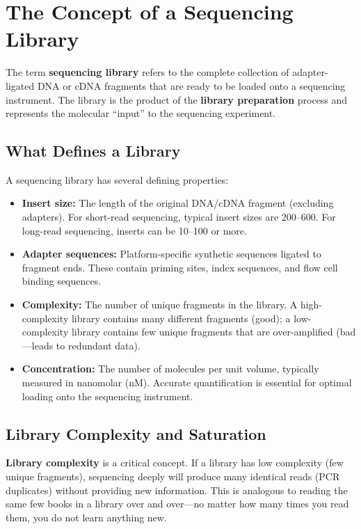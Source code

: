 \section{The Concept of a Sequencing Library}
\label{sec:seqprinciples:library}

The term \textbf{sequencing library} refers to the complete collection of adapter-ligated DNA or cDNA fragments that are ready to be loaded onto a sequencing instrument. The library is the product of the \textbf{library preparation} process and represents the molecular ``input'' to the sequencing experiment.

\subsection{What Defines a Library}
\label{subsec:seqprinciples:library-definition}

A sequencing library has several defining properties:

\begin{itemize}[itemsep=2pt]
  \item \textbf{Insert size:} The length of the original DNA/cDNA fragment (excluding adapters). For short-read sequencing, typical insert sizes are 200--600\basepair{}. For long-read sequencing, inserts can be 10--100\kilobase{} or more.
  \item \textbf{Adapter sequences:} Platform-specific synthetic sequences ligated to fragment ends. These contain priming sites, index sequences, and flow cell binding sequences.
  \item \textbf{Complexity:} The number of unique fragments in the library. A high-complexity library contains many different fragments (good); a low-complexity library contains few unique fragments that are over-amplified (bad---leads to redundant data).
  \item \textbf{Concentration:} The number of molecules per unit volume, typically measured in nanomolar (nM). Accurate quantification is essential for optimal loading onto the sequencing instrument.
\end{itemize}

\subsection{Library Complexity and Saturation}
\label{subsec:seqprinciples:library-complexity}

\textbf{Library complexity} is a critical concept. If a library has low complexity (few unique fragments), sequencing deeply will produce many identical reads (PCR duplicates) without providing new information. This is analogous to reading the same few books in a library over and over---no matter how many times you read them, you do not learn anything new.

